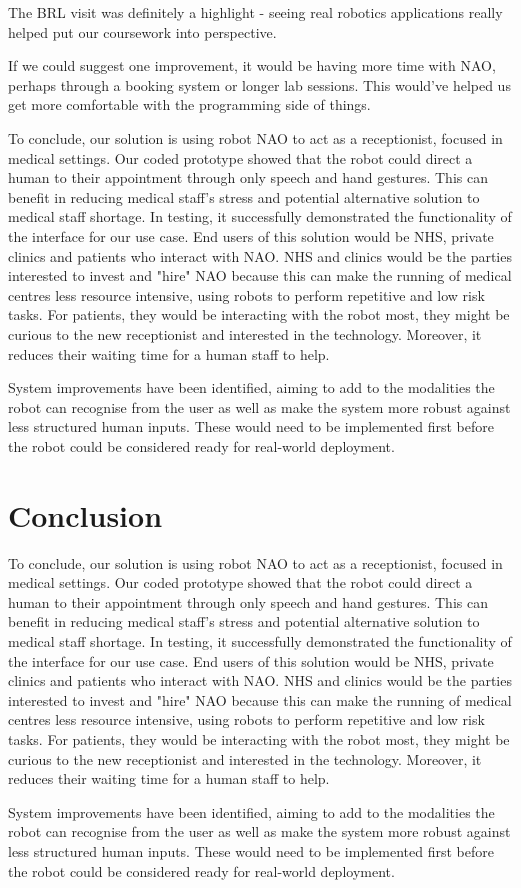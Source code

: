 \documentclass[conference]{IEEEtran}
\begin{document}
The BRL visit was definitely a highlight - seeing real robotics applications really helped put our coursework into perspective.

If we could suggest one improvement, it would be having more time with NAO, perhaps through a booking system or longer lab sessions. This would've helped us get more comfortable with the programming side of things.

To conclude, our solution is using robot NAO to act as a receptionist, focused in medical settings. Our coded prototype showed that the robot could direct a human to their appointment through only speech and hand gestures. This can benefit in reducing medical staff's stress and potential alternative solution to medical staff shortage. In testing, it successfully demonstrated the functionality of the interface for our use case. End users of this solution would be NHS, private clinics and patients who interact with NAO. NHS and clinics would be the parties interested to invest and "hire" NAO because this can make the running of medical centres less resource intensive, using robots to perform repetitive and low risk tasks. For patients, they would be interacting with the robot most, they might be curious to the new receptionist and interested in the technology. Moreover, it reduces their waiting time for a human staff to help.

System improvements have been identified, aiming to add to the modalities the robot can recognise from the user as well as make the system more robust against less structured human inputs. These would need to be implemented first before the robot could be considered ready for real-world deployment.

\section{Conclusion}

To conclude, our solution is using robot NAO to act as a receptionist, focused in medical settings. Our coded prototype showed that the robot could direct a human to their appointment through only speech and hand gestures. This can benefit in reducing medical staff's stress and potential alternative solution to medical staff shortage. In testing, it successfully demonstrated the functionality of the interface for our use case. End users of this solution would be NHS, private clinics and patients who interact with NAO. NHS and clinics would be the parties interested to invest and "hire" NAO because this can make the running of medical centres less resource intensive, using robots to perform repetitive and low risk tasks. For patients, they would be interacting with the robot most, they might be curious to the new receptionist and interested in the technology. Moreover, it reduces their waiting time for a human staff to help.

System improvements have been identified, aiming to add to the modalities the robot can recognise from the user as well as make the system more robust against less structured human inputs. These would need to be implemented first before the robot could be considered ready for real-world deployment.



\end{document}
